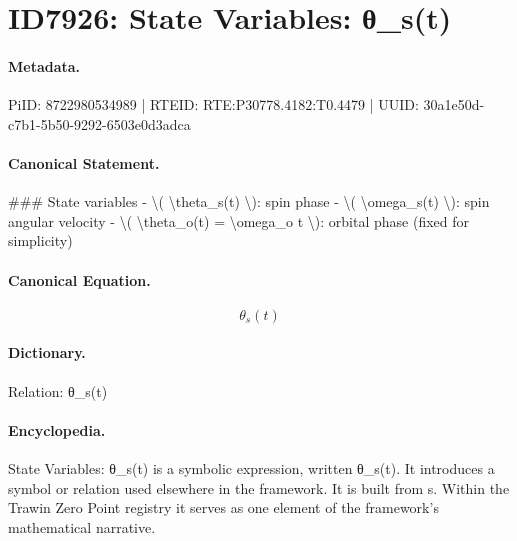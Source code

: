 \section*{ID7926: State Variables: θ\_s(t)}
\paragraph{Metadata.}
PiID: 8722980534989 | RTEID: RTE:P30778.4182:T0.4479 | UUID: 30a1e50d-c7b1-5b50-9292-6503e0d3adca

\paragraph{Canonical Statement.}
\#\#\# State variables - \textbackslash{}( \textbackslash{}theta\_s(t) \textbackslash{}): spin phase - \textbackslash{}( \textbackslash{}omega\_s(t) \textbackslash{}): spin angular velocity - \textbackslash{}( \textbackslash{}theta\_o(t) = \textbackslash{}omega\_o t \textbackslash{}): orbital phase (fixed for simplicity)

\paragraph{Canonical Equation.}
\[
\theta_s(t)
\]

\paragraph{Dictionary.}
Relation: θ\_s(t)

\paragraph{Encyclopedia.}
State Variables: θ\_s(t) is a symbolic expression, written θ\_s(t). It introduces a symbol or relation used elsewhere in the framework. It is built from s. Within the Trawin Zero Point registry it serves as one element of the framework's mathematical narrative.
